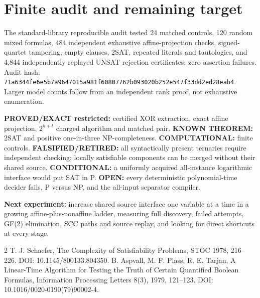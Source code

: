 \documentclass[11pt]{article}
\begin{document}
\section{Finite audit and remaining target}
The standard-library reproducible audit tested 24 matched controls, 120 random mixed formulas, 484 independent exhaustive affine-projection checks, signed-quartet tampering, empty clauses, 2SAT, repeated literals and tautologies, and 4,844 independently replayed UNSAT rejection certificates; zero assertion failures. Audit hash: \texttt{71a6344fe6e5b7a9647015a981f60807762b093020b252e547f33dd2ed28eab4}. Larger model counts follow from an independent rank proof, not exhaustive enumeration.
\par\noindent\textbf{PROVED/EXACT restricted:} certified XOR extraction, exact affine projection, $2^{h+t}$ charged algorithm and matched pair. \textbf{KNOWN THEOREM:} 2SAT and positive one-in-three NP-completeness. \textbf{COMPUTATIONAL:} finite controls. \textbf{FALSIFIED/RETIRED:} all syntactically present ternaries require independent checking; locally satisfiable components can be merged without their shared source. \textbf{CONDITIONAL:} a uniformly acquired all-instance logarithmic interface would put SAT in P. \textbf{OPEN:} every deterministic polynomial-time decider fails, P versus NP, and the all-input separator compiler.\par
\noindent\textbf{Next experiment:} increase shared source interface one variable at a time in a growing affine-plus-nonaffine ladder, measuring full discovery, failed attempts, GF(2) elimination, SCC paths and source replay, and looking for direct shortcuts at every stage.
\begin{thebibliography}{2}
 T. J. Schaefer, The Complexity of Satisfiability Problems, STOC 1978, 216--226. DOI: 10.1145/800133.804350.
 B. Aspvall, M. F. Plass, R. E. Tarjan, A Linear-Time Algorithm for Testing the Truth of Certain Quantified Boolean Formulas, Information Processing Letters 8(3), 1979, 121--123. DOI: 10.1016/0020-0190(79)90002-4.
\end{thebibliography}
\end{document}
